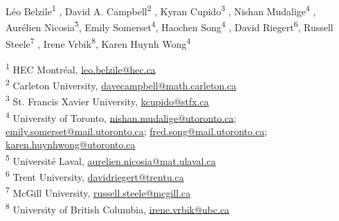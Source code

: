 \begin{center}
\small
Léo Belzile\textsuperscript{1} ,
David A. Campbell\textsuperscript{2} ,
Kyran Cupido\textsuperscript{3} ,
Nishan Mudalige\textsuperscript{4} ,
Aurélien Nicosia\textsuperscript{5},
Emily Somerset\textsuperscript{4},
Haochen Song\textsuperscript{4} ,
David Riegert\textsuperscript{6},
Russell Steele\textsuperscript{7} ,
Irene Vrbik\textsuperscript{8},
Karen Huynh Wong\textsuperscript{4}

\vspace{0.75em}

\footnotesize
\textsuperscript{1} HEC Montréal, \href{mailto:leo.belzile@hec.ca}{leo.belzile@hec.ca}\\
\textsuperscript{2} Carleton University, \href{mailto:davecampbell@math.carleton.ca}{davecampbell@math.carleton.ca}\\
\textsuperscript{3} St. Francis Xavier University, \href{mailto:kcupido@stfx.ca}{kcupido@stfx.ca}\\
\textsuperscript{4} University of Toronto, \href{mailto:nishan.mudalige@utoronto.ca}{nishan.mudalige@utoronto.ca}; \href{mailto:emily.somerset@mail.utoronto.ca}{emily.somerset@mail.utoronto.ca}; \href{mailto:fred.song@mail.utoronto.ca}{fred.song@mail.utoronto.ca}; \href{mailto:karen.huynhwong@utoronto.ca}{karen.huynhwong@utoronto.ca}\\
\textsuperscript{5} Université Laval, \href{mailto:aurelien.nicosia@mat.ulaval.ca}{aurelien.nicosia@mat.ulaval.ca}\\
\textsuperscript{6} Trent University, \href{mailto:davidriegert@trentu.ca}{davidriegert@trentu.ca}\\
\textsuperscript{7} McGill University, \href{mailto:russell.steele@mcgill.ca}{russell.steele@mcgill.ca}\\
\textsuperscript{8} University of British Columbia, \href{mailto:irene.vrbik@ubc.ca}{irene.vrbik@ubc.ca}
\end{center}
